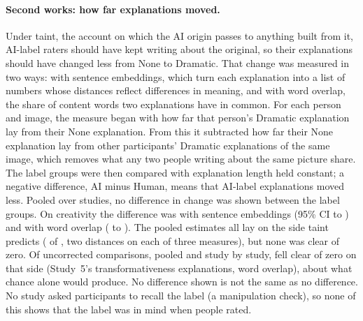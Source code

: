 \paragraph*{Second works: how far explanations moved.}
Under taint, the account on which the AI origin passes to anything built from it, AI-label raters should have kept writing about the original, so their explanations should have changed less from None to Dramatic. That change was measured in two ways: with sentence embeddings, which turn each explanation into a list of numbers whose distances reflect differences in meaning, and with word overlap, the share of content words two explanations have in common.\cite{reimers2019sentencebert,sentencetransformers2021allmpnet} For each person and image, the measure began with how far that person's Dramatic explanation lay from their None explanation. From this it subtracted how far their None explanation lay from other participants' Dramatic explanations of the same image, which removes what any two people writing about the same picture share. The label groups were then compared with explanation length held constant; a negative difference, AI minus Human, means that AI-label explanations moved less. Pooled over studies, no difference in change was shown between the label groups. On creativity the difference was \XSCreatShiftEmbEst{} with sentence embeddings (95\% CI \XSCreatShiftEmbLo{} to \XSCreatShiftEmbHi) and \XSCreatShiftWordEst{} with word overlap (\XSCreatShiftWordLo{} to \XSCreatShiftWordHi). The pooled estimates all lay on the side taint predicts (\XSShiftNPooledTaintLean{} of \XSShiftNPooled, two distances on each of three measures), but none was clear of zero. Of \XSShiftNRows{} uncorrected comparisons, pooled and study by study, \XSShiftNRowsTaint{} fell clear of zero on that side (Study~5's transformativeness explanations, word overlap), about what chance alone would produce. No difference shown is not the same as no difference. No study asked participants to recall the label (a manipulation check), so none of this shows that the label was in mind when people rated.

